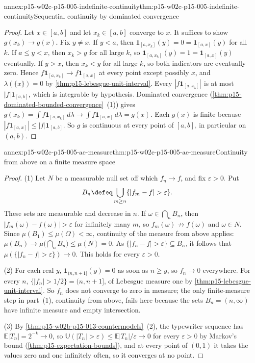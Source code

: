 \begin{annexitem}{annex:p15-w02c-p15-005-indefinite-continuity}{thm:p15-w02c-p15-005-indefinite-continuity}{Sequential continuity by dominated convergence}
\begin{proof}
Let \(x\in[a,b]\) and let \(x_k\in[a,b]\) converge to \(x\). It
suffices to show \(g(x_k)\to g(x)\). Fix \(y\neq x\). If \(y<a\), then
\(\mathbf1_{[a,x_k]}(y)=0=\mathbf1_{[a,x]}(y)\) for all \(k\). If
\(a\leq y<x\), then \(x_k>y\) for all large \(k\), so
\(\mathbf1_{[a,x_k]}(y)=1=\mathbf1_{[a,x]}(y)\) eventually. If
\(y>x\), then \(x_k<y\) for all large \(k\), so both indicators are
eventually zero. Hence
\(f\mathbf1_{[a,x_k]}\to f\mathbf1_{[a,x]}\) at every point except
possibly \(x\), and \(\lambda(\{x\})=0\) by
\cref{thm:p15-lebesgue-unit-interval}. Every
\(|f\mathbf1_{[a,x_k]}|\) is at most \(|f|\mathbf1_{[a,b]}\), which is
integrable by hypothesis. Dominated convergence
(\cref{thm:p15-dominated-bounded-convergence}~(1)) gives
\(g(x_k)=\int f\mathbf1_{[a,x_k]}\,d\lambda\to
\int f\mathbf1_{[a,x]}\,d\lambda=g(x)\). Each \(g(x)\) is finite
because \(|f\mathbf1_{[a,x]}|\leq|f|\mathbf1_{[a,b]}\). So \(g\) is
continuous at every point of \([a,b]\), in particular on \((a,b)\).
\end{proof}
\end{annexitem}

\begin{annexitem}{annex:p15-w02c-p15-005-ae-measure}{thm:p15-w02c-p15-005-ae-measure}{Continuity from above on a finite measure space}
\begin{proof}
(1) Let \(N\) be a measurable null set off which \(f_n\to f\), and fix
\(\varepsilon>0\). Put
\[
 B_n\defeq\bigcup_{m\geq n}\{|f_m-f|>\varepsilon\}.
\]
These sets are measurable and decrease in \(n\). If
\(\omega\in\bigcap_nB_n\), then \(|f_m(\omega)-f(\omega)|>\varepsilon\)
for infinitely many \(m\), so \(f_m(\omega)\not\to f(\omega)\) and
\(\omega\in N\). Since \(\mu(B_1)\leq\mu(\Omega)<\infty\), continuity
of the measure from above applies:
\(\mu(B_n)\to\mu\bigl(\bigcap_nB_n\bigr)\leq\mu(N)=0\). As
\(\{|f_n-f|>\varepsilon\}\subseteq B_n\), it follows that
\(\mu(\{|f_n-f|>\varepsilon\})\to0\). This holds for every
\(\varepsilon>0\).

(2) For each real \(y\), \(\mathbf1_{(n,n+1]}(y)=0\) as soon as
\(n\geq y\), so \(f_n\to0\) everywhere. For every \(n\),
\(\{|f_n|>1/2\}=(n,n+1]\), of Lebesgue measure one by
\cref{thm:p15-lebesgue-unit-interval}. So \(f_n\) does not converge to
zero in measure; the only finite-measure step in part~(1), continuity
from above, fails here because the sets
\(B_n=(n,\infty)\) have infinite measure and empty intersection.

(3) By \cref{thm:p15-w02b-p15-013-countermodels}~(2), the typewriter
sequence has \(\mathbb E|T_n|=2^{-k}\to0\), so
\(\mathbb U(|T_n|>\varepsilon)\leq\mathbb E|T_n|/\varepsilon\to0\)
for every \(\varepsilon>0\) by Markov's bound
(\cref{thm:p15-expectation-bounds}), and at every point of \((0,1)\)
it takes the values zero and one infinitely often, so it converges at
no point.
\end{proof}
\end{annexitem}

